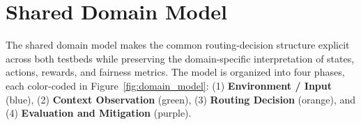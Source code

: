 \documentclass{IEEEtran}
\begin{document}
\section{Shared Domain Model}

The shared domain model makes the common routing-decision structure explicit
across both testbeds while preserving the domain-specific interpretation of
states, actions, rewards, and fairness metrics. The model is organized into
four phases, each color-coded in Figure~\ref{fig:domain_model}: (1)
\textcolor{phase1blue}{\textbf{Environment / Input}} (blue), (2)
\textcolor{phase2green}{\textbf{Context Observation}} (green), (3)
\textcolor{phase3orange}{\textbf{Routing Decision}} (orange), and (4)
\textcolor{phase4purple}{\textbf{Evaluation and Mitigation}} (purple).
\end{document}
